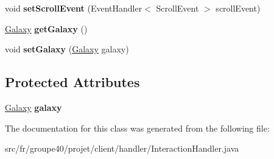 \begin{DoxyCompactItemize}
\mbox{\label{classfr_1_1groupe40_1_1projet_1_1client_1_1handler_1_1_interaction_handler_a2f82e0247f4e7282c58435f778fd90cc}} 
void {\bfseries set\+Scroll\+Event} (Event\+Handler$<$ Scroll\+Event $>$ scroll\+Event)
\item 
\mbox{\label{classfr_1_1groupe40_1_1projet_1_1client_1_1handler_1_1_interaction_handler_a1998207353f48dbf08bdbd58c301fb57}} 
\hyperlink{classfr_1_1groupe40_1_1projet_1_1model_1_1board_1_1_galaxy}{Galaxy} {\bfseries get\+Galaxy} ()
\item 
\mbox{\label{classfr_1_1groupe40_1_1projet_1_1client_1_1handler_1_1_interaction_handler_a0b8b96a543adcd6eba599d445891885d}} 
void {\bfseries set\+Galaxy} (\hyperlink{classfr_1_1groupe40_1_1projet_1_1model_1_1board_1_1_galaxy}{Galaxy} galaxy)
\end{DoxyCompactItemize}
\subsection*{Protected Attributes}
\begin{DoxyCompactItemize}
\item 
\mbox{\label{classfr_1_1groupe40_1_1projet_1_1client_1_1handler_1_1_interaction_handler_a39d69fa50a2af5e3403d5ba85e08d354}} 
\hyperlink{classfr_1_1groupe40_1_1projet_1_1model_1_1board_1_1_galaxy}{Galaxy} {\bfseries galaxy}
\end{DoxyCompactItemize}


The documentation for this class was generated from the following file\+:\begin{DoxyCompactItemize}
\item 
src/fr/groupe40/projet/client/handler/Interaction\+Handler.\+java\end{DoxyCompactItemize}
